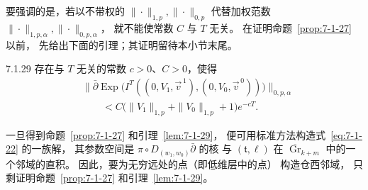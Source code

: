 要强调的是，若以不带权的
$\|\cdot\|_{1,p},\|\cdot\|_{0,p}$
代替加权范数
$\|\cdot\|_{1,p,\alpha},\|\cdot\|_{0,p,\alpha}$，
就不能使常数 $C$ 与 $T$ 无关。
在证明命题~\ref{prop:7-1-27} 以前，
先给出下面的引理；其证明留待本小节末尾。

\begin{lemma}{7.1.29}\label{lem:7-1-29}
存在与 $T$ 无关的常数 $c>0$、$C>0$，使得
\[
\begin{aligned}
&\bigl\|\bar\partial\operatorname{Exp}
\bigl(I^T((0,V_1,\vec v^{\,1}),
(0,V_0,\vec v^{\,0}))\bigr)\bigr\|_{0,p,\alpha}\\
&\qquad<C\bigl(\|V_1\|_{1,p}
 +\|V_0\|_{1,p}+1\bigr)e^{-cT}.
\end{aligned}
\]
\end{lemma}

一旦得到命题~\ref{prop:7-1-27}
和引理~\ref{lem:7-1-29}，
便可用标准方法构造式~\eqref{eq:7-1-22} 的一族解，
其参数空间是
$\pi\circ D_{(w_1,w_0)}\bar\partial$ 的核
与 $(\mathfrak t,\ell)$ 在
$\overline{\operatorname{Gr}}_{k+m}$
中的一个邻域的直积。
因此，要为无穷远处的点（即低维层中的点）
构造仓西邻域，
只剩证明命题~\ref{prop:7-1-27}
和引理~\ref{lem:7-1-29}。
